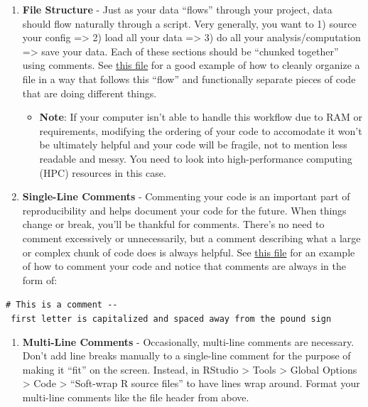 \documentclass[
]{book}
\providecommand{\tightlist}{%
  \setlength{\itemsep}{0pt}\setlength{\parskip}{0pt}}
\begin{document}
\begin{enumerate}
\def\labelenumi{\arabic{enumi}.}
\setcounter{enumi}{1}
\tightlist
\item
  \textbf{File Structure} - Just as your data ``flows'' through your project, data should flow naturally through a script. Very generally, you want to 1) source your config =\textgreater{} 2) load all your data =\textgreater{} 3) do all your analysis/computation =\textgreater{} save your data. Each of these sections should be ``chunked together'' using comments. See \href{https://github.com/kmishra9/Flu-Absenteeism/blob/master/Master's\%20Thesis\%20-\%20Spatial\%20Epidemiology\%20of\%20Influenza/2a\%20-\%20Statistical-Inputs.R}{this file} for a good example of how to cleanly organize a file in a way that follows this ``flow'' and functionally separate pieces of code that are doing different things.

  \begin{itemize}
  \tightlist
  \item
    \textbf{Note}: If your computer isn't able to handle this workflow due to RAM or requirements, modifying the ordering of your code to accomodate it won't be ultimately helpful and your code will be fragile, not to mention less readable and messy. You need to look into high-performance computing (HPC) resources in this case.
  \end{itemize}
\item
  \textbf{Single-Line Comments} - Commenting your code is an important part of reproducibility and helps document your code for the future. When things change or break, you'll be thankful for comments. There's no need to comment excessively or unnecessarily, but a comment describing what a large or complex chunk of code does is always helpful. See \href{https://github.com/kmishra9/Flu-Absenteeism/blob/master/Master's\%20Thesis\%20-\%20Spatial\%20Epidemiology\%20of\%20Influenza/1b\%20-\%20Map-Management.R}{this file} for an example of how to comment your code and notice that comments are always in the form of:
\end{enumerate}

\texttt{\#\ This\ is\ a\ comment\ -\/-\ first\ letter\ is\ capitalized\ and\ spaced\ away\ from\ the\ pound\ sign}

\begin{enumerate}
\def\labelenumi{\arabic{enumi}.}
\setcounter{enumi}{3}
\tightlist
\item
  \textbf{Multi-Line Comments} - Occasionally, multi-line comments are necessary. Don't add line breaks manually to a single-line comment for the purpose of making it ``fit'' on the screen. Instead, in RStudio \textgreater{} Tools \textgreater{} Global Options \textgreater{} Code \textgreater{} ``Soft-wrap R source files'' to have lines wrap around. Format your multi-line comments like the file header from above.
\end{enumerate}
\end{document}
